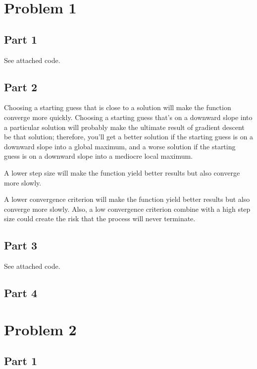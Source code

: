 \documentclass[12pt]{article}
\begin{document}
\section{Problem 1}

\subsection{Part 1}

See attached code.

\subsection{Part 2}

Choosing a starting guess that is close to a solution will make the function converge more quickly. Choosing a starting guess that's on a downward slope into a particular solution will probably make the ultimate result of gradient descent be that solution; therefore, you'll get a better solution if the starting guess is on a downward slope into a global maximum, and a worse solution if the starting guess is on a downward slope into a mediocre local maximum.

A lower step size will make the function yield better results but also converge more slowly.

A lower convergence criterion will make the function yield better results but also converge more slowly. Also, a low convergence criterion combine with a high step size could create the risk that the process will never terminate.

\subsection{Part 3}

See attached code.

\subsection{Part 4}


\section{Problem 2}

\subsection{Part 1}
\end{document}
